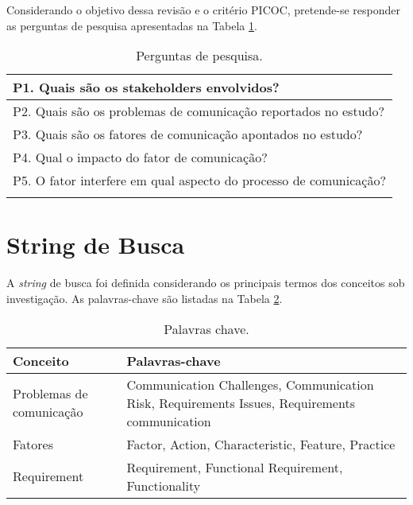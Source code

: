 Considerando o objetivo dessa revisão e o critério PICOC, pretende-se responder as perguntas de pesquisa apresentadas na Tabela \ref{tab:rqs}.

        \begin{table}[h!]
        \centering
        \caption{Perguntas de pesquisa.}
        \begin{tabular}{p{12cm}}
        
        \hline
        
P1. Quais são os stakeholders envolvidos? \\\hline
P2. Quais são os problemas de comunicação reportados no estudo?\\\hline
P3. Quais são os fatores de comunicação apontados no estudo?\\\hline
P4. Qual o impacto do fator de comunicação?\\\hline
P5. O fator interfere em qual aspecto do processo de comunicação?\\\hline


        \label{tab:rqs}
        \end{tabular}
        \end{table}        

\section{String de Busca}

A \emph{string} de busca foi definida considerando os principais termos dos conceitos sob investigação. As palavras-chave são listadas na Tabela \ref{tab:keywords}.

        \begin{table}[h!]
        \centering
        \caption{Palavras chave.}
        \label{tab:keywords}
        \begin{tabular}{p{5cm}p{9cm}}
        \hline
        \textbf{Conceito}  & \textbf{Palavras-chave}   \\ \hline
        Problemas de comunicação                               & Communication Challenges, Communication Risk, Requirements Issues, Requirements communication       \\ \hline
        Fatores & Factor, Action, Characteristic, Feature, Practice \\ \hline
        Requirement &Requirement, Functional Requirement, Functionality \\\hline
        
        \end{tabular}
        \end{table}
  
